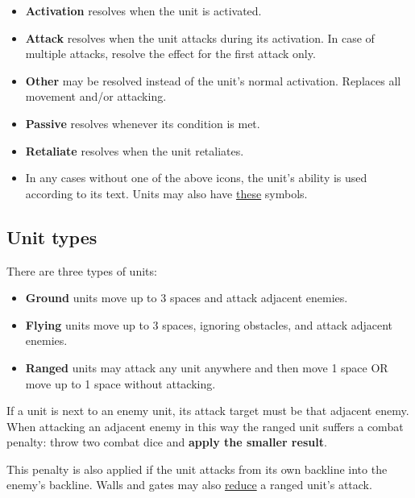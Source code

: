 \documentclass[12pt]{article}
\def\assets{assets}
\def\svgs{\assets/svgs}
\begin{document}
    \begin{itemize}[wide]
      \item\textbf{Activation}  resolves when the unit is activated.
      \item\textbf{Attack}  resolves when the unit attacks during its activation. In case of multiple attacks, resolve the effect for the first attack only.
      \item\textbf{Other}  may be resolved instead of the unit's normal activation. Replaces all movement and/or attacking.
      \item\textbf{Passive}  resolves whenever its condition is met.
      \item\textbf{Retaliate}  resolves when the unit retaliates.
      \item In any cases without one of the above icons, the unit’s ability is used according to its text. Units may also have \hyperlink{Playerdecks}{these} symbols.
    \end{itemize}

\clearpage
\subsection*{\hypertarget{Unittype}{Unit types}}
There are three types of units:
\begin{itemize}
    \item \textbf{Ground}  units move up to 3 spaces and attack adjacent enemies.
    \item \textbf{Flying}  units move up to 3 spaces, ignoring obstacles, and attack adjacent enemies.
    \item \textbf{Ranged}  units may attack any unit anywhere and then move 1 space OR move up to 1 space without attacking.
\end{itemize}
If a  unit is next to an enemy unit, its attack target must be that adjacent enemy. When attacking an adjacent enemy in this way the ranged unit suffers a combat penalty: throw two combat dice and \textbf{apply the smaller result}.\par
This penalty is also applied if the  unit attacks from its own backline into the enemy's backline. Walls and gates may also \hyperlink{Walls}{reduce} a ranged unit's attack.
\end{document}
